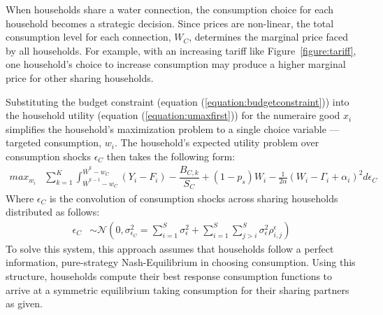 \documentclass[12pt]{article}
\begin{document}
When households share a water connection, the consumption choice for each household becomes a strategic decision.  Since prices are non-linear, the total consumption level for each connection, $W_C$, determines the marginal price faced by all households.  For example, with an increasing tariff like Figure~\ref{figure:tariff}, one household's choice to increase consumption may produce a higher marginal price for other sharing households.  

Substituting the budget constraint (equation (\ref{equation:budgetconstraint})) into the household utility (equation (\ref{equation:umaxfirst})) for the numeraire good $x_i$ simplifies the household's maximization problem to a single choice variable --- targeted consumption, $w_i$.  The household's expected utility problem over consumption shocks $\epsilon_C$ then takes the following form:
\begin{align*}
max_{w_i} &\sum_{k=1}^{K} \int_{\overline{W}^{k-1}-{w_C}}^{\overline{W}^{k}-{w_C}} (Y_i - F_i) -  \dfrac{ B_{C,k} }{S_C}     + (1-p_s) W_i   - \frac{1}{2\alpha } ( W_i - \Gamma_i + \alpha_i )^2  d \epsilon_C  
\end{align*}
Where $\epsilon_C$ is the convolution of consumption shocks across sharing households distributed as follows:
\begin{align*}
          \epsilon_C &\sim \mathcal{N}(0,\sigma_{\epsilon_C}^2 = \sum_{i=1}^{S} \sigma_{\epsilon}^2 + \sum_{i=1}^{S} \sum_{j>i}^{S} \sigma_{\epsilon}^2 \rho^{\epsilon}_{i,j} )
\end{align*}
To solve this system, this approach assumes that households follow a perfect information, pure-strategy Nash-Equilibrium in choosing consumption.  Using this structure, households compute their best response consumption functions to arrive at a symmetric equilibrium taking consumption for their sharing partners as given.  
\end{document}
